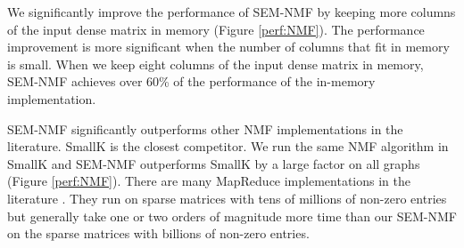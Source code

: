 We significantly improve the performance of SEM-NMF by keeping more columns
of the input dense matrix in memory (Figure \ref{perf:NMF}). The performance
improvement is more significant when the number of columns that fit in memory
is small. When we keep eight columns of the input dense matrix in memory,
SEM-NMF achieves over 60\% of the performance of the in-memory implementation.

SEM-NMF significantly outperforms other NMF implementations in the literature.
SmallK is the closest competitor. We run the same NMF algorithm in SmallK and
SEM-NMF outperforms SmallK by a large factor on all graphs (Figure
\ref{perf:NMF}). There are many MapReduce implementations in
the literature \cite{Liao14, Yin14, Liu10}. They run on sparse
matrices with tens of millions of non-zero entries but generally take
one or two orders of magnitude more time than our SEM-NMF on the sparse matrices
with billions of non-zero entries.
